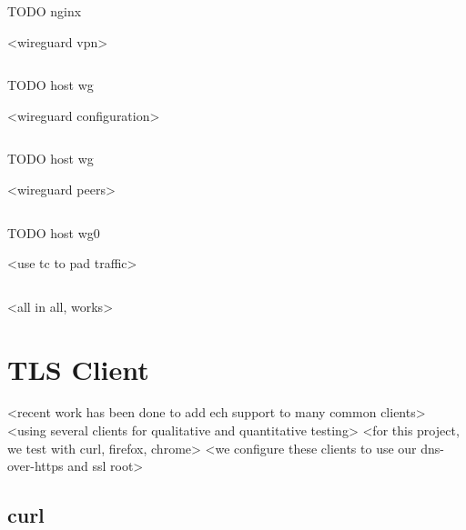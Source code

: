 \begin{listing}[ht]
\inputminted{nginx}{snippets/nginx}
\caption[Distributed ECH NGINX configuration for tcd.example.com]{TODO nginx}
\end{listing}

<wireguard vpn>\cite{donenfeld2017wireguard}

\begin{listing}[ht]
\inputminted{bash}{snippets/host_wg.bash}
\caption[Generating a new WireGuard key pair for tcd.example.com]{TODO host wg}
\end{listing}

<wireguard configuration>

\begin{listing}[ht]
\inputminted{ini}{snippets/host_wg.ini}
\caption[Configuring a WireGuard network interface using systemd]{TODO host wg}
\end{listing}

<wireguard peers>

\begin{listing}[ht]
\inputminted{ini}{snippets/host_wg0.ini}
\caption[Static WireGuard network configuration using systemd]{TODO host wg0}
\end{listing}

<use tc to pad traffic>
\cite{almesberger1999linux, hemminger2005network}

\begin{listing}[ht]
\inputminted{bash}{snippets/padding.bash}
\caption[Rudimentary script to shroud legitimate WireGuard communication]{}
\end{listing}

<all in all, works>











\section{TLS Client}

<recent work has been done to add ech support to many common clients>
<using several clients for qualitative and quantitative testing>
<for this project, we test with curl, firefox, chrome>
<we configure these clients to use our dns-over-https and ssl root>

\subsection{curl}

